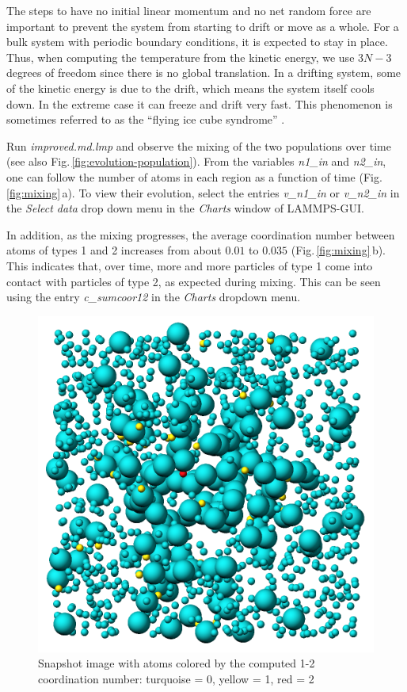 \documentclass[9pt,tutorial]{livecoms}
\begin{document}
The steps to have no initial linear momentum and no net random force are
important to prevent the system from starting to drift or move as a
whole.  For a bulk system with periodic boundary conditions, it is
expected to stay in place. Thus, when computing the temperature from the
kinetic energy, we use $3N-3$ degrees of freedom since there is no
global translation.  In a drifting system, some of the kinetic energy is
due to the drift, which means the system itself cools down.  In the
extreme case it can freeze and drift very fast. This phenomenon is
sometimes referred to as the ``flying ice cube syndrome''
\cite{wong2016good}.

Run \textit{improved.md.lmp} and observe the mixing of the two populations
over time (see also Fig.\,\ref{fig:evolution-population}).  From the
variables \textit{n1\_in} and \textit{n2\_in}, one can follow the number
of atoms in each region as a function of time
(Fig.\,\ref{fig:mixing}\,a).  To view their evolution, select the entries
\textit{v\_n1\_in} or \textit{v\_n2\_in} in the \textit{Select data} drop
down menu in the \textit{Charts} window of LAMMPS-GUI.

In addition, as the mixing progresses, the average coordination number
between atoms of types 1 and 2 increases from about $0.01$ to $0.035$
(Fig.\,\ref{fig:mixing}\,b).  This indicates that, over time, more and
more particles of type 1 come into contact with particles of type 2, as
expected during mixing.  This can be seen using the entry
\textit{c\_sumcoor12} in the \textit{Charts} dropdown menu.

\begin{figure}
\centering
\includegraphics[width=0.55\linewidth]{LJ-coords}
\caption{Snapshot image with atoms colored by the computed 1-2 coordination
  number: turquoise = 0, yellow = 1, red = 2}
\label{fig:coords-viz}
\end{figure}
\end{document}
